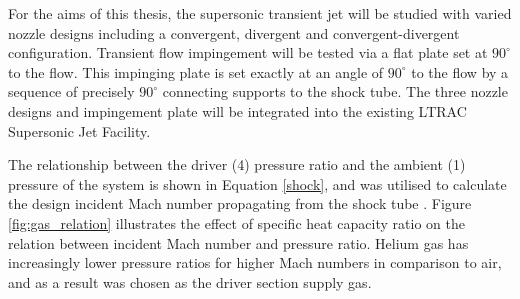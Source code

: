 For the aims of this thesis, the supersonic transient jet will be studied with varied nozzle designs including a convergent, divergent and convergent-divergent configuration. Transient flow impingement will be tested via a flat plate set at $90^\circ$ to the flow. This impinging plate is set exactly at an angle of $90^\circ$ to the flow by a sequence of precisely $90^\circ$ connecting supports to the shock tube. The three nozzle designs and impingement plate will be integrated into the existing LTRAC Supersonic Jet Facility.

The relationship between the driver (4) pressure ratio and the ambient (1) pressure of the system is shown in Equation \ref{shock}, and was utilised to calculate the design incident Mach number propagating from the shock tube \citep{anderson2010fundamentals}. Figure \ref{fig:gas_relation} illustrates the effect of specific heat capacity ratio on the relation between incident Mach number and pressure ratio. Helium gas has increasingly lower pressure ratios for higher Mach numbers in comparison to air, and as a result was chosen as the driver section supply gas.

